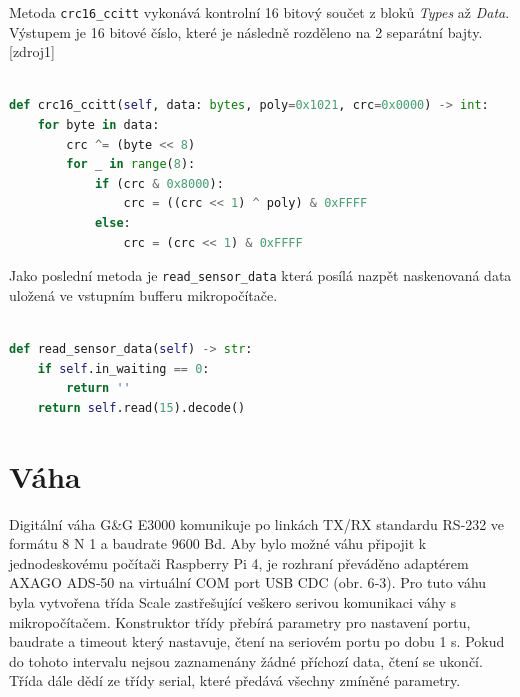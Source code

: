 %
%
%           
%

\bigskip
Metoda \texttt{crc16\_ccitt} vykonává kontrolní 16 bitový součet z bloků \textit{Types} až \textit{Data}. Výstupem je 16 bitové číslo, které je následně rozděleno na 2 separátní bajty.[zdroj1]

\begin{lstlisting}[language=Python,breaklines=true, frame=single,postbreak=\mbox{\tiny$\hookrightarrow$}]

def crc16_ccitt(self, data: bytes, poly=0x1021, crc=0x0000) -> int:
    for byte in data:
        crc ^= (byte << 8)
        for _ in range(8):
            if (crc & 0x8000):
                crc = ((crc << 1) ^ poly) & 0xFFFF
            else:
                crc = (crc << 1) & 0xFFFF
\end{lstlisting}
\bigskip
Jako poslední metoda je \texttt{read\_sensor\_data} která posílá nazpět naskenovaná data uložená ve vstupním bufferu mikropočítače.
\begin{lstlisting}[language=Python,breaklines=true, frame=single,postbreak=\mbox{\tiny$\hookrightarrow$}]

def read_sensor_data(self) -> str:
    if self.in_waiting == 0:
        return ''
    return self.read(15).decode()
\end{lstlisting}

\section{Váha}
Digitální váha G\&G E3000 komunikuje po linkách TX/RX standardu RS‑232 ve formátu 8 N 1 a baudrate 9600 Bd. Aby bylo možné váhu připojit k jednodeskovému počítači Raspberry Pi 4, je rozhraní převáděno adaptérem AXAGO ADS‑50 na virtuální COM port USB CDC (obr. 6‑3). Pro tuto váhu byla vytvořena třída Scale zastřešující veškero serivou komunikaci váhy s mikropočítačem. Konstruktor třídy přebírá parametry pro nastavení portu, baudrate a timeout který nastavuje, čtení na seriovém portu po dobu 1 s. Pokud do tohoto intervalu nejsou zaznamenány žádné příchozí data, čtení se ukončí. Třída dále dědí ze třídy serial, které předává všechny zmíněné parametry.

